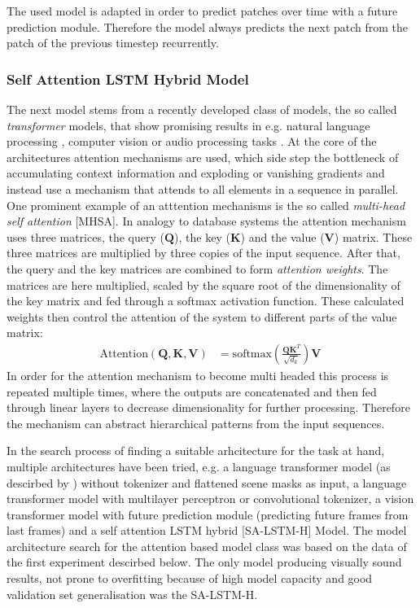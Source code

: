 \documentclass[12pt]{article}
\begin{document}
The used model is adapted in order to predict patches over time with a future prediction module. Therefore the model always predicts the next patch from the patch of the previous timestep recurrently.

\subsubsection{Self Attention LSTM Hybrid Model}
The next model stems from a recently developed class of models, the so called \textit{transformer} models, that show promising results in e.g. natural language processing \citep{vaswani2017attention}, computer vision \citep{khan2022transformers} or audio processing tasks \citep{gong2021ast}. At the core of the architectures attention mechanisms are used, which side step the bottleneck of accumulating context information and exploding or vanishing gradients and instead use a mechanism that attends to all elements in a sequence in parallel. One prominent example of an atttention mechanisms is the so called \textit{multi-head self attention} [MHSA]. In analogy to database systems the attention mechanism uses three matrices, the query ($\mathbf{Q}$), the key ($\mathbf{K}$) and the value ($\mathbf{V}$) matrix. These three matrices are multiplied by three copies of the input sequence. After that, the query and the key matrices are combined to form \textit{attention weights}. The matrices are here multiplied, scaled by the square root of the dimensionality of the key matrix and fed through a softmax activation function. These calculated weights then control the attention of the system to different parts of the value matrix:
\begin{equation}
\begin{aligned}
	\text{Attention}(\mathbf{Q}, \mathbf{K}, \mathbf{V}) &= \text{softmax}\left(\frac{\mathbf{Q}\mathbf{K}^T}{\sqrt{d_k}}\right)\mathbf{V} \
\end{aligned}
\end{equation}
In order for the attention mechanism to become multi headed this process is repeated multiple times, where the outputs are concatenated and then fed through linear layers to decrease dimensionality for further processing. Therefore the mechanism can abstract hierarchical patterns from the input sequences. 

In the search process of finding a suitable arhcitecture for the task at hand, multiple architectures have been tried, e.g. a language transformer model (as descirbed by \citep{vaswani2017attention}) without tokenizer and flattened scene masks as input, a language transformer model with multilayer perceptron or convolutional tokenizer, a vision transformer model \citep{dosovitskiy2020image} with future prediction module (predicting future frames from last frames) and a self attention LSTM hybrid [SA-LSTM-H] Model. The model architecture search for the attention based model class was based on the data of the first experiment descirbed below. The only model producing visually sound results, not prone to overfitting because of high model capacity and good validation set generalisation was the SA-LSTM-H. 
\end{document}
